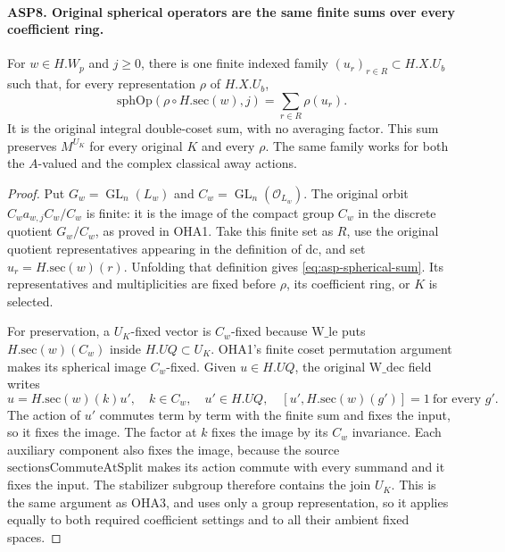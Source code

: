\documentclass[11pt,a4paper]{article}
\numberwithin{equation}{section}
\theoremstyle{remark}\newtheorem{remark}[theorem]{Remark}
\begin{document}
\paragraph{ASP8. Original spherical operators are the same finite sums over every coefficient ring.}
\label{claim:ASP8}
For $w\in H.W_p$ and $j\geq0$, there is one
finite indexed family $(u_r)_{r\in R}\subset H.X.U_b$
such that, for every representation $\rho$ of
$H.X.U_b$,
\begin{equation}\label{eq:asp-spherical-sum}
 \mathrm{sphOp}(\rho\circ H.\mathrm{sec}(w),\allowbreak{} j)
                           =\sum_{r\in R}\rho(u_r).
\end{equation}
It is the original integral double-coset sum, with
no averaging factor.  This sum preserves
$M^{U_K}$ for every original $K$ and every $\rho$.
The same family works for both the $A$-valued
and the complex classical away actions.
\begin{proof}
Put $G_w=\operatorname{GL}_n(L_w)$ and
$C_w=\operatorname{GL}_n(\mathcal O_{L_w})$.
The original orbit $C_wa_{w,\allowbreak{} j}C_w/C_w$ is finite:
it is the image of the compact group $C_w$ in
the discrete quotient $G_w/C_w$, as proved in
OHA1.  Take this finite set as $R$, use the
original quotient representatives appearing in
the definition of $\mathrm{dc}$, and set
$u_r=H.\mathrm{sec}(w)(r)$.  Unfolding that
definition gives \eqref{eq:asp-spherical-sum}.
Its representatives and multiplicities are fixed
before $\rho$, its coefficient ring, or $K$
is selected.

For preservation, a $U_K$-fixed vector is
$C_w$-fixed because $\mathrm{W\_\allowbreak le}$ puts
$H.\mathrm{sec}(w)(C_w)$ inside $H.UQ\subset U_K$.
OHA1's finite coset permutation argument makes
its spherical image $C_w$-fixed.  Given
$u\in H.UQ$, the original $\mathrm{W\_\allowbreak dec}$
field writes
\[
 u=H.\mathrm{sec}(w)(k)u',\quad k\in C_w,
 \quad u'\in H.UQ,\quad
       [u',\allowbreak{} H.\mathrm{sec}(w)(g')]=1\ \text{for every }g'.
\]
The action of $u'$ commutes term by term with
the finite sum and fixes the input, so it fixes
the image.  The factor at $k$ fixes the image
by its $C_w$ invariance.  Each auxiliary component
also fixes the image, because the source
$\mathrm{sectionsCommuteAtSplit}$ makes its
action commute with every summand and it fixes
the input.  The stabilizer subgroup therefore
contains the join $U_K$.  This is the same
argument as OHA3, and uses only a group
representation, so it applies equally to both
required coefficient settings and to all their
ambient fixed spaces.
\end{proof}
\end{document}
